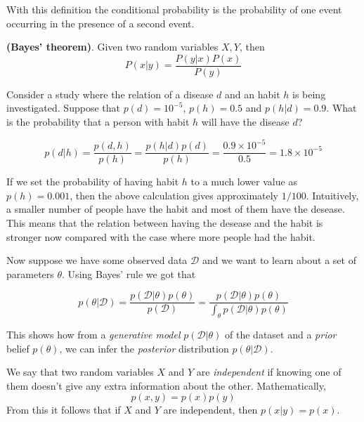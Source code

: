 \documentclass[oneside,openright,titlepage,numbers=noenddot,openany,headinclude,footinclude=true,
  cleardoublepage=empty,abstractoff,BCOR=5mm,paper=a4,fontsize=12pt]{scrreprt}
\begin{document}
With this definition the
conditional probability is the probability of one event occurring in the presence of a
second event. \\

\begin{theorem}
  \textbf{(Bayes' theorem)}. Given two random variables \(X,Y\), then
  \[
  P(x|y)= \frac{P(y|x)P(x)}{P(y)}
  \]
\end{theorem}



\begin{exampleth}
Consider a study where the relation of a disease \(d\) and an habit \(h\)
is being investigated. Suppose that \(p(d)=10^{-5}\), \(p(h)=0.5\) and \(p(h|d) = 0.9\). What is the
probability that a person with habit \(h\) will have the disease \(d\)?

\[
p(d|h) = \frac{p(d,h)}{p(h)} = \frac{p(h|d)p(d)}{p(h)} =
\frac{ 0.9 \times 10^{-5}}{ 0.5 } = 1.8 \times 10^{-5}
\]

If we set the probability of having habit \(h\) to a much lower value as \(p(h) =
0.001\), then the above calculation gives approximately \(1/100\). Intuitively, a smaller number of people have the habit and most of them have the
desease. This means that the relation between having the desease and the habit
is stronger now compared with the case where more people had the habit.
\end{exampleth}

Now suppose we have some observed data \(\mathcal{D}\) and we want to learn about
a set of parameters \(\theta\). Using Bayes' rule we got that

\[
p(\theta|\mathcal{D}) = \frac{p(\mathcal{D}|\theta)p(\theta)}{p(\mathcal{D})} =
\frac{p(\mathcal{D}|\theta)p(\theta)}{ \int_{\theta} p(\mathcal{D}|\theta)p(\theta)}
\]

This shows how from a \emph{generative model} \(p(\mathcal{D}|\theta)\) of the dataset
and a \emph{prior} belief \(p(\theta)\), we can infer the \emph{posterior} distribution
\(p(\theta|\mathcal{D})\). \\

\begin{definition}
We say that two random variables \(X\) and \(Y\) are \emph{independent} if knowing one of them doesn't give any extra information about the other. Mathematically,
\[
p(x,y) = p(x) p(y)
\]
From this it follows that if \(X\) and \(Y\) are independent, then \(p(x|y) = p(x)\).
\end{definition}
\end{document}

